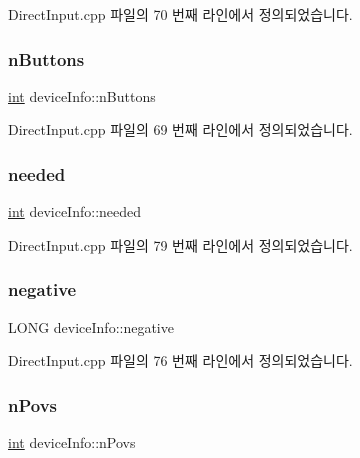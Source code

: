 Direct\+Input.\+cpp 파일의 70 번째 라인에서 정의되었습니다.

\mbox{\label{structdevice_info_ad88fd10c7065c35ea68687b9871ebed0}} 
\subsubsection{\texorpdfstring{n\+Buttons}{nButtons}}
{\footnotesize\ttfamily \mbox{\hyperlink{_util_8cpp_a0ef32aa8672df19503a49fab2d0c8071}{int}} device\+Info\+::n\+Buttons}



Direct\+Input.\+cpp 파일의 69 번째 라인에서 정의되었습니다.

\mbox{\label{structdevice_info_a3e85cef35fcad73f9f5fcd75a627ec80}} 
\subsubsection{\texorpdfstring{needed}{needed}}
{\footnotesize\ttfamily \mbox{\hyperlink{_util_8cpp_a0ef32aa8672df19503a49fab2d0c8071}{int}} device\+Info\+::needed}



Direct\+Input.\+cpp 파일의 79 번째 라인에서 정의되었습니다.

\mbox{\label{structdevice_info_a8131c05a7b3332b266af2aa8f2e6528a}} 
\subsubsection{\texorpdfstring{negative}{negative}}
{\footnotesize\ttfamily L\+O\+NG device\+Info\+::negative}



Direct\+Input.\+cpp 파일의 76 번째 라인에서 정의되었습니다.

\mbox{\label{structdevice_info_a5554d019728b7dace75256a64411417c}} 
\subsubsection{\texorpdfstring{n\+Povs}{nPovs}}
{\footnotesize\ttfamily \mbox{\hyperlink{_util_8cpp_a0ef32aa8672df19503a49fab2d0c8071}{int}} device\+Info\+::n\+Povs}



